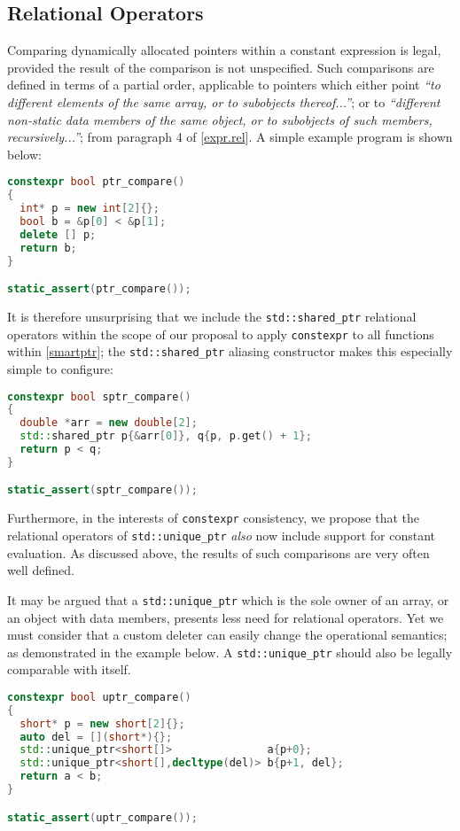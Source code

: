 \documentclass[10pt]{article}
\newcommand*{\wgxxi}[1]{[\href{https://wg21.link/#1}{#1}]}
\begin{document}
\subsection{Relational Operators}

Comparing dynamically allocated pointers within a constant expression is legal,
provided the result of the comparison is not unspecified.  Such comparisons are
defined in terms of a partial order, applicable to pointers which either point
\emph{``to different elements of the same array, or to subobjects
thereof...''}; or to \emph{``different non-static data members of the same
object, or to subobjects of such members, recursively...''}; from paragraph 4
of \wgxxi{expr.rel}. A simple example program is shown below:

\begin{lstlisting}[language=cpp]
constexpr bool ptr_compare()
{
  int* p = new int[2]{};
  bool b = &p[0] < &p[1];
  delete [] p;
  return b;
}

static_assert(ptr_compare());
\end{lstlisting}

It is therefore unsurprising that we include the \texttt{std::shared\_ptr}
relational operators within the scope of our proposal to apply
\texttt{constexpr} to all functions within \wgxxi{smartptr}; the
\texttt{std::shared\_ptr} aliasing constructor makes this especially simple to
configure:

\begin{lstlisting}[language=cpp]
constexpr bool sptr_compare()
{
  double *arr = new double[2];
  std::shared_ptr p{&arr[0]}, q{p, p.get() + 1};
  return p < q;
}

static_assert(sptr_compare());
\end{lstlisting}

Furthermore, in the interests of \texttt{constexpr} consistency, we propose
that the relational operators of \texttt{std::unique\_ptr} \emph{also} now
include support for constant evaluation. As discussed above, the results of
such comparisons are very often well defined.

It may be argued that a \texttt{std::unique\_ptr} which is the sole owner of an
array, or an object with data members, presents less need for relational
operators. Yet we must consider that a custom deleter can easily change the
operational semantics; as demonstrated in the example below. A
\texttt{std::unique\_ptr} should also be legally comparable with itself.

\begin{lstlisting}[language=cpp]
constexpr bool uptr_compare()
{
  short* p = new short[2]{};
  auto del = [](short*){};
  std::unique_ptr<short[]>               a{p+0};
  std::unique_ptr<short[],decltype(del)> b{p+1, del};
  return a < b;
}

static_assert(uptr_compare());
\end{lstlisting}
\end{document}
